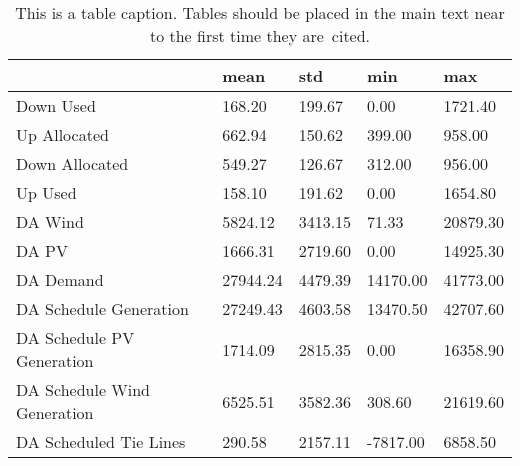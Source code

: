\begin{table}[H] 
    \caption{This is a table caption. Tables should be placed in the main text near to the first time they are~cited.\label{tab1}}
    \begin{tabularx}{\textwidth}{CCCCC}
    \toprule
    & \textbf{mean}	& \textbf{std}	& \textbf{min} & \textbf{max}\\
    \midrule
    Down Used & 168.20 & 199.67 & 0.00 & 1721.40 \\
    Up Allocated & 662.94 & 150.62 & 399.00 & 958.00 \\
    Down Allocated & 549.27 & 126.67 & 312.00 & 956.00 \\
    Up Used & 158.10 & 191.62 & 0.00 & 1654.80 \\
    DA Wind & 5824.12 & 3413.15 & 71.33 & 20879.30 \\
    DA PV & 1666.31 & 2719.60 & 0.00 & 14925.30 \\
    DA Demand & 27944.24 & 4479.39 & 14170.00 & 41773.00 \\
    DA Schedule Generation & 27249.43 & 4603.58 & 13470.50 & 42707.60 \\
    DA Schedule PV Generation & 1714.09 & 2815.35 & 0.00 & 16358.90 \\
    DA Schedule Wind Generation & 6525.51 & 3582.36 & 308.60 & 21619.60 \\
    DA Scheduled Tie Lines & 290.58 & 2157.11 & -7817.00 & 6858.50 \\
    \bottomrule
    \end{tabularx}
\end{table}

